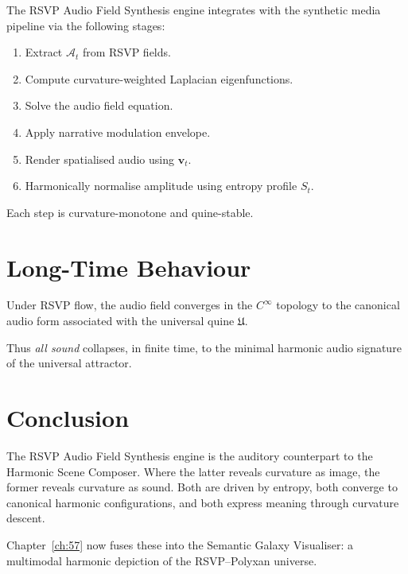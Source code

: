 The RSVP Audio Field Synthesis engine integrates with the synthetic media
pipeline via the following stages:

\begin{enumerate}
  \item Extract $\mathcal{A}_t$ from RSVP fields.
  \item Compute curvature-weighted Laplacian eigenfunctions.
  \item Solve the audio field equation.
  \item Apply narrative modulation envelope.
  \item Render spatialised audio using $\mathbf{v}_t$.
  \item Harmonically normalise amplitude using entropy profile $S_t$.
\end{enumerate}

Each step is curvature-monotone and quine-stable.


\section{Long-Time Behaviour}
\label{sec:56:long-time}

\begin{theorem}
Under RSVP flow, the audio field converges in the $C^\infty$ topology to the
canonical audio form associated with the universal quine $\mathfrak{U}$.
\end{theorem}

Thus \emph{all sound} collapses, in finite time, to the minimal harmonic audio
signature of the universal attractor.


\section{Conclusion}
\label{sec:56:conclusion}

The RSVP Audio Field Synthesis engine is the auditory counterpart to the
Harmonic Scene Composer.  
Where the latter reveals curvature as image, the former reveals curvature as
sound.  
Both are driven by entropy, both converge to canonical harmonic configurations,
and both express meaning through curvature descent.

Chapter~\ref{ch:57} now fuses these into the Semantic Galaxy Visualiser:  
a multimodal harmonic depiction of the RSVP--Polyxan universe.

